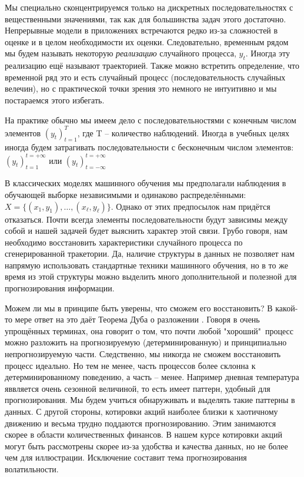 \documentclass[12pt,fleqn]{article}
\begin{document}
Мы специально сконцентрируемся только на дискретных последовательностях с вещественными значениями, так как для большинства задач этого достаточно. Непрерывные модели в приложениях встречаются редко из-за сложностей в оценке и в целом необходимости их оценки. Следовательно, временным рядом мы будем называть некоторую \emph{реализацию} случайного процесса, $y_t$. Иногда эту реализацию ещё называют траекторией. Также можно встретить определение, что временной ряд это и есть случайный процесс (последовательность случайных велечин), но с практической точки зрения это немного не интуитивно и мы постараемся этого избегать.

На практике обычно мы имеем дело с последовательностями с конечным числом элементов $(y_t)_{t=1}^{T}$, где T -- количество наблюдений. Иногда в учебных целях иногда будем затрагивать последовательности с бесконечным числом элементов: $(y_t)_{t=1}^{t=+\infty}$ или $(y_t)_{t=-\infty}^{t=+\infty}$

В классических моделях машинного обучения мы предполагали наблюдения в обучающей выборке независимыми и одинаково распределёнными: $X = \{(x_1, y_1), \dots, (x_\ell, y_\ell)\}$. Однако от этих предпосылок нам придётся отказаться. Почти всегда элементы последовательности будут зависимы между собой и нашей задачей будет выяснить характер этой связи. Грубо говоря, нам необходимо восстановить характеристики случайного процесса по сгенерированной тракетории. Да, наличие структуры в данных не позволяет нам напрямую использовать стандартные техники машинного обучения, но в то же время из этой структуры можно выделить много дополнительной и полезной для прогнозирования информации.


Можем ли мы в принципе быть уверены, что сможем его восстановить? В какой-то мере ответ на это даёт Теорема Дуба о разложении \cite{doob}. Говоря в очень упрощённых терминах, она говорит о том, что почти любой "хороший"\ процесс можно разложить на прогнозируемую (детерминированную) и принципиально непрогнозируемую части. Следственно, мы никогда не сможем восстановить процесс идеально. Но тем не менее, часть процессов более склонна к детерминированному поведению, а часть -- менее. Например дневная температура яввляется очень сезонной величиной, то есть имеет паттерн, удобный для прогнозирования. Мы будем учиться обнаруживать и выделять такие паттерны в данных. С другой стороны, котировки акций наиболее близки к хаотичному движению и весьма трудно поддаются прогнозированию. Этим занимаются скорее в области количественных финансов. В нашем курсе котировки акций могут быть рассмотрены скорее из-за удобства и качества данных, но не более чем для иллюстрации. Исключение составит тема прогнозирования волатильности.
\end{document}
